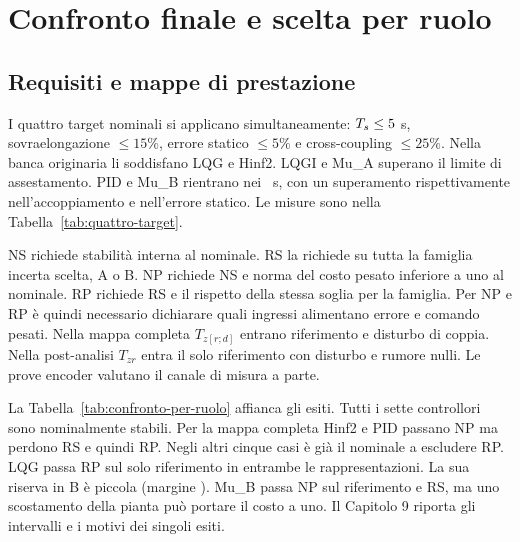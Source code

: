 \chapter{Confronto finale e scelta per ruolo}

\section{Requisiti e mappe di prestazione}
I quattro target nominali si applicano simultaneamente:
$T_s\leq 5$ s, sovraelongazione $\leq15\%$,
errore statico $\leq5\%$ e cross-coupling $\leq25\%$.
Nella banca originaria li soddisfano LQG e Hinf2.
LQGI e Mu\_A superano il limite di assestamento. PID e
Mu\_B rientrano nei \FinTsLimit\ s, con un superamento
rispettivamente nell'accoppiamento e nell'errore statico.
Le misure sono nella Tabella~\ref{tab:quattro-target}.

NS richiede stabilità interna al nominale. RS la richiede su
tutta la famiglia incerta scelta, A o B. NP richiede NS e
norma del costo pesato inferiore a uno al nominale. RP
richiede RS e il rispetto della stessa soglia per la famiglia.
Per NP e RP è quindi necessario dichiarare quali ingressi
alimentano errore e comando pesati. Nella mappa completa
$T_{z[r;d]}$ entrano riferimento e disturbo di coppia.
Nella post-analisi $T_{zr}$ entra il solo riferimento con
disturbo e rumore nulli. Le prove encoder valutano il
canale di misura a parte.



La Tabella~\ref{tab:confronto-per-ruolo} affianca gli esiti.
Tutti i sette controllori sono nominalmente stabili. Per
la mappa completa Hinf2 e PID passano NP ma perdono RS
e quindi RP. Negli altri cinque casi è già il nominale a
escludere RP. LQG passa RP sul solo riferimento in entrambe
le rappresentazioni. La sua riserva in B è piccola
(margine \FinLQGIntervalloRPRB). Mu\_B passa NP sul
riferimento e RS, ma uno scostamento della pianta può
portare il costo a uno. Il Capitolo 9 riporta gli intervalli
e i motivi dei singoli esiti.

